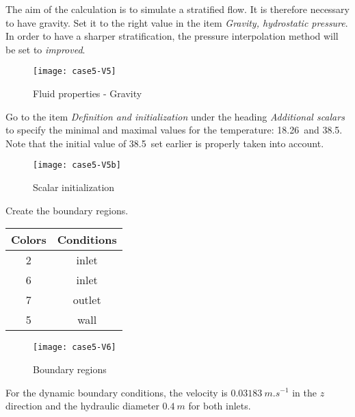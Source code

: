 \newpage
The aim of the calculation is to simulate a stratified flow. It is therefore
necessary to have gravity. Set it to the right value in the item
{\itshape Gravity, hydrostatic pressure}.  In order to have a sharper
stratification, the pressure interpolation method will be set to
{\itshape improved}.

\begin{figure}[h!]
\begin{center}
\texttt{[image: case5-V5]}
\caption{Fluid properties - Gravity}
\label{fig3_e5}
\end{center}
\end{figure}


\newpage

Go to the item {\itshape Definition and initialization} under the heading
{\itshape Additional scalars} to specify the minimal and maximal values for the
temperature: 18.26\degresC\ and 38.5\degresC. Note that the initial value of
38.5\degresC\ set earlier is properly taken into account.

\begin{figure}[h!]
\begin{center}
\texttt{[image: case5-V5b]}
\caption{Scalar initialization}
\label{fig4_e5}
\end{center}
\end{figure}


\newpage
Create the boundary regions.

\begin{center}
\begin{tabular}{|c|c|}
\hline
Colors & Conditions \\
\hline
2 & inlet \\
\hline
6 & inlet \\
\hline
7 & outlet \\
\hline
5 & wall \\
\hline
\end{tabular}
\end{center}

\begin{figure}[h!]
\begin{center}
\texttt{[image: case5-V6]}
\caption{Boundary regions}
\label{fig5_e5}
\end{center}
\end{figure}


\newpage
For the dynamic boundary conditions, the velocity is $0.03183\ m.s^{-1}$ in the
$z$ direction and the hydraulic diameter $0.4\ m$ for both inlets.


